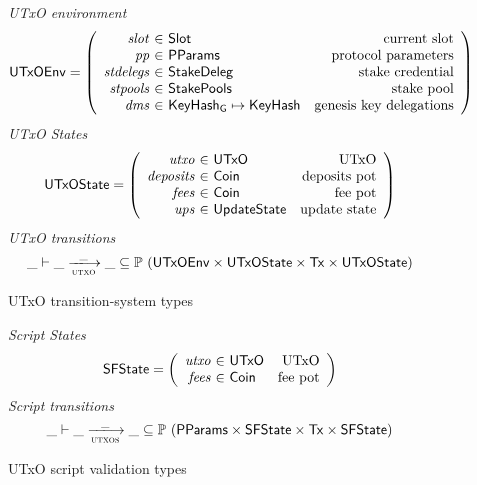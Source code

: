 \begin{figure}[htb]
  \emph{UTxO environment}
  \begin{equation*}
    \UTxOEnv =
    \left(
      \begin{array}{r@{~\in~}lr}
        \var{slot} & \Slot & \text{current slot}\\
        \var{pp} & \PParams & \text{protocol parameters}\\
        \var{stdelegs} & \StakeDeleg & \text{stake credential}\\
        \var{stpools} & \StakePools & \text{stake pool}\\
        \var{dms} & \KeyHashGen\mapsto\KeyHash & \text{genesis key delegations} \\
      \end{array}
    \right)
  \end{equation*}
  \emph{UTxO States}
  \begin{equation*}
    \UTxOState =
    \left(
      \begin{array}{r@{~\in~}lr}
        \var{utxo} & \UTxO & \text{UTxO}\\
        \var{deposits} & \Coin & \text{deposits pot}\\
        \var{fees} & \Coin & \text{fee pot}\\
        \var{ups} & \UpdateState & \text{update state}\\
      \end{array}
    \right)
  \end{equation*}
  \emph{UTxO transitions}
  \begin{equation*}
    \_ \vdash
    \var{\_} \trans{utxo}{\_} \var{\_}
    \subseteq \powerset (\UTxOEnv \times \UTxOState \times \Tx \times \UTxOState)
  \end{equation*}
  \caption{UTxO transition-system types}
  \label{fig:ts-types:utxo-shelley}
\end{figure}


\begin{figure}[htb]
  \emph{Script States}
  \begin{equation*}
    \SFState =
    \left(
      \begin{array}{r@{~\in~}lr}
        \var{utxo} & \UTxO & \text{UTxO}\\
        \var{fees} & \Coin & \text{fee pot}\\
      \end{array}
    \right)
  \end{equation*}
  \emph{Script transitions}
  \begin{equation*}
    \_ \vdash
    \var{\_} \trans{utxos}{\_} \var{\_}
    \subseteq \powerset (\PParams \times \SFState \times \Tx \times \SFState)
  \end{equation*}
  \caption{UTxO script validation types}
  \label{fig:ts-types:utxo-scripts}
\end{figure}

